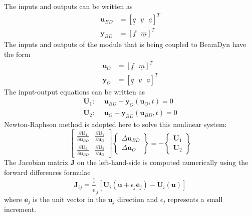 \documentclass{aiaa-tc}
\renewcommand{\vec}[1]{\underline{#1}}
\begin{document}
The inputs and outputs can be written as
\begin{align}
    \label{BDInput}
    \mathbf{u}_{BD} &= \left[ \vec{q}~~~\vec{v}~~~\vec{a}\right]^T \\
    \label{BDOutput}
    \mathbf{y}_{BD} &= \left[ \vec{f}~~~\vec{m} \right]^T
\end{align}
The inputs and outputs of the module that is being coupled to BeamDyn have the form
\begin{align}
    \label{OtherInput}
    \mathbf{u}_{O} &= \left[ \vec{f}~~~\vec{m} \right]^T\\
    \label{OtherOutput}
    \mathbf{y}_{O} &= \left[ \vec{q}~~~\vec{v}~~~\vec{a}\right]^T 
\end{align}
The input-output equations can be written as
\begin{align}
    \label{IOEq1}
    \mathbf{U}_1: ~~&\mathbf{u}_{BD} - \mathbf{y}_{O} (\mathbf{u}_O,t)= 0 \\
    \label{IOEq2}
     \mathbf{U}_2: ~~&\mathbf{u}_{O} - \mathbf{y}_{BD}(\mathbf{u}_{BD},t) = 0
\end{align}
Newton-Raphson method is adopted here to solve this nonlinear system: 
\begin{equation}
    \label{NREq}
    \begin{bmatrix}
    \frac{\partial \mathbf{U}_1}{\partial \mathbf{u}_{BD}}  &  \frac{\partial \mathbf{U}_{1}}{\partial \mathbf{u}_{O}} \\
    \frac{\partial \mathbf{U}_2}{\partial \mathbf{u}_{BD}}  &  \frac{\partial \mathbf{U}_{2}}{\partial \mathbf{u}_{O}} 
    \end{bmatrix}
    \begin{Bmatrix}
     \Delta \mathbf{u}_{BD} \\
     \Delta \mathbf{u}_{O}
    \end{Bmatrix} 
    =
    -
    \begin{Bmatrix}
     \mathbf{U}_1 \\
     \mathbf{U}_2
    \end{Bmatrix}
\end{equation}
 The Jacobian matrix $\mathbf{J}$ on the left-hand-side is computed numerically using the forward differences formulae
 \begin{equation}
     \label{Jacobian}
     \mathbf{J}_{ij} = \frac{1}{\epsilon}_j \left[\mathbf{U}_i(\mathbf{u}+\epsilon_j \mathbf{e}_j) - \mathbf{U}_i(\mathbf{u}) \right]
 \end{equation}
 where $\mathbf{e}_j$ is the unit vector in the $\mathbf{u}_j$ direction and $\epsilon_j$ represents a small increment.
 
\end{document}
